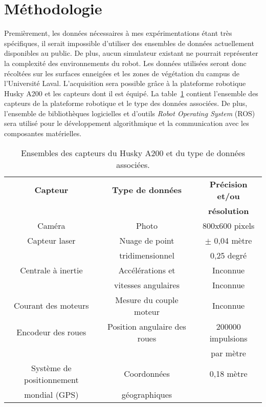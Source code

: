 \documentclass[12pt, letterpaper]{article} %
\begin{document}
\section{Méthodologie}
Premièrement, les données nécessaires à mes expérimentations étant très spécifiques, il serait impossible d'utiliser des ensembles de données actuellement disponibles au public. De plus, aucun simulateur existant ne pourrait représenter la complexité des environnements du robot. Les données utilisées seront donc récoltées sur les surfaces enneigées et les zones de végétation du campus de l'Université Laval. L'acquisition sera possible grâce à la plateforme robotique Husky A200 \cite{huskyClearpath} et les capteurs dont il est équipé. La table~\ref{tab:capteurs} contient l'ensemble des capteurs de la plateforme robotique et le type des données associées. De plus, l'ensemble de bibliothèques logicielles et d'outils \textit{Robot Operating System} (ROS)~\cite{ros} sera utilisé pour le développement algorithmique et la communication avec les composantes matérielles.

\begin{table}[h]
    \begin{center}
    \caption{\label{tab:capteurs} Ensembles des capteurs du Husky A200 et du type de données associées.}
    \begin{tabular}{|c|c|c|}
        \hline
        \textbf{Capteur} & \textbf{Type de données} & \textbf{Précision et/ou}\\
        				 &							& \textbf{résolution} \\
        \hline
        \hline
        Caméra & Photo & 800x600 pixels\\
        \hline
        Capteur laser & Nuage de point & $\pm$ 0,04 mètre\\
                      & tridimensionnel & 0,25 degré\\
        \hline
        Centrale à inertie & Accélérations et & Inconnue\\
                           & vitesses angulaires & Inconnue\\
        \hline
        Courant des moteurs & Mesure du couple moteur & Inconnue\\
        \hline     
        Encodeur des roues & Position angulaire des roues & 200000 impulsions\\
        				   &							  &  par mètre\\
        \hline
        Système de positionnement & Coordonnées & 0,18 mètre\\
        mondial (GPS)             & géographiques & \\
        \hline
    \end{tabular}
    \end{center}
\end{table}
\end{document}
